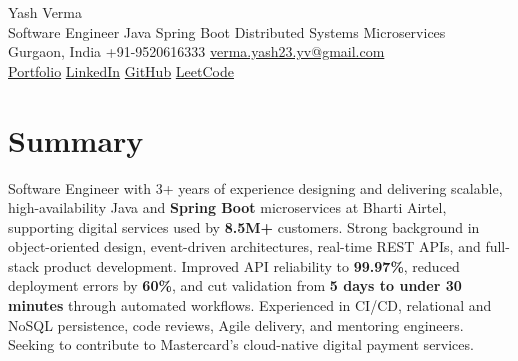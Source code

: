 \documentclass[letterpaper,11pt]{article}
\begin{document}
\begin{center}
  {\Huge Yash Verma} \\
  \small Software Engineer \textperiodcentered{} Java \textperiodcentered{} Spring Boot \textperiodcentered{} Distributed Systems \textperiodcentered{} Microservices \\
  \vspace{5pt}
  \small Gurgaon, India \textbar{} +91-9520616333 \textbar{}
  \href{mailto:verma.yash23.yv@gmail.com}{verma.yash23.yv@gmail.com} \\
  \vspace{7pt}
  \href{https://yashverma230600.github.io/yash-portfolio/}{Portfolio} \textbar{}
  \href{https://www.linkedin.com/in/yash-verma-9243a7193/}{LinkedIn} \textbar{}
  \href{https://github.com/yashverma230600}{GitHub} \textbar{}
  \href{https://leetcode.com/yashverma230600}{LeetCode}
  \vspace{-8pt}
\end{center}

\section{Summary}
\begin{itemize}[leftmargin=0.15in, label={}]
  \small{\item{
    Software Engineer with 3+ years of experience designing and delivering scalable, high-availability Java and \textbf{Spring Boot} microservices at Bharti Airtel, supporting digital services used by \textbf{8.5M+} customers. Strong background in object-oriented design, event-driven architectures, real-time REST APIs, and full-stack product development. Improved API reliability to \textbf{99.97\%}, reduced deployment errors by \textbf{60\%}, and cut validation from \textbf{5 days to under 30 minutes} through automated workflows. Experienced in CI/CD, relational and NoSQL persistence, code reviews, Agile delivery, and mentoring engineers. Seeking to contribute to Mastercard's cloud-native digital payment services.
  }}
\end{itemize}
\vspace{-8pt}

\end{document}
